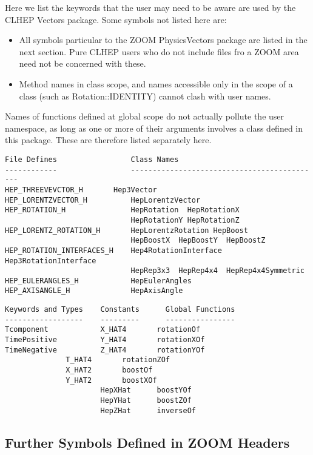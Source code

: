 Here we list the keywords that the user may need to be aware are used by the 
CLHEP Vectors package.  Some symbols not listed here are:

\begin{itemize}
\item
All symbols particular to the ZOOM PhysicsVectors package are listed in 
the next section.  Pure CLHEP users who do not include files fro a ZOOM 
area need not be concerned with these.

\item
Method names in class scope, and names accessible only in the scope of a
class (such as Rotation::IDENTITY) cannot clash with user names.
\end{itemize}

Names of functions defined at global scope do not actually pollute the user
namespace, as long as one or more of their arguments involves a class
defined in this package.  These are therefore listed separately here.

\begin{verbatim}
File Defines                 Class Names
------------                 --------------------------------------------
HEP_THREEVEVCTOR_H 	     Hep3Vector
HEP_LORENTZVECTOR_H          HepLorentzVector
HEP_ROTATION_H               HepRotation  HepRotationX  
                             HepRotationY HepRotationZ
HEP_LORENTZ_ROTATION_H       HepLorentzRotation HepBoost 
                             HepBoostX  HepBoostY  HepBoostZ
HEP_ROTATION_INTERFACES_H    Hep4RotationInterface  Hep3RotationInterface 
                             HepRep3x3  HepRep4x4  HepRep4x4Symmetric  
HEP_EULERANGLES_H            HepEulerAngles
HEP_AXISANGLE_H              HepAxisAngle
\end{verbatim}

\begin{verbatim}
Keywords and Types    Constants      Global Functions
------------------    ---------      ----------------	
Tcomponent            X_HAT4	   rotationOf
TimePositive          Y_HAT4       rotationXOf     
TimeNegative          Z_HAT4       rotationYOf         
		      T_HAT4       rotationZOf     
		      X_HAT2	   boostOf	
		      Y_HAT2	   boostXOf	
                      HepXHat      boostYOf
                      HepYHat      boostZOf
                      HepZHat      inverseOf
\end{verbatim}

\subsection {Further Symbols Defined in ZOOM Headers} 


